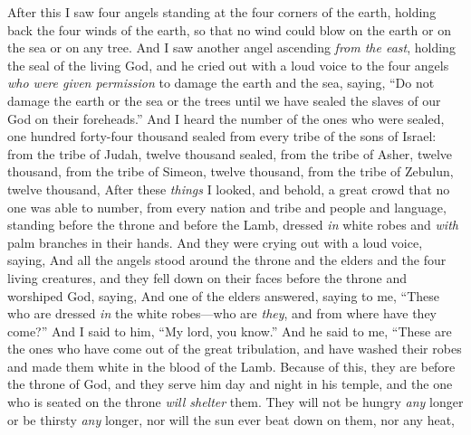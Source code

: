 \begin{biblechapter} %
 After this I saw four angels standing at the four corners of the earth, holding back the four winds of the earth, so that no wind could blow on the earth or on the sea or on any tree.
\verse And I saw another angel ascending \textit{from the east}, holding the seal of the living God, and he cried out with a loud voice to the four angels \textit{who were given permission} to damage the earth and the sea,
\verse saying, “Do not damage the earth or the sea or the trees until we have sealed the slaves of our God on their foreheads.”
\verse And I heard the number of the ones who were sealed, one hundred forty-four thousand sealed from every tribe of the sons of Israel:
\verse from the tribe of Judah, twelve thousand sealed,
\verse from the tribe of Asher, twelve thousand,
\verse from the tribe of Simeon, twelve thousand,
\verse from the tribe of Zebulun, twelve thousand,
 After these \textit{things} I looked, and behold, a great crowd that no one was able to number, from every nation and tribe and people and language, standing before the throne and before the Lamb, dressed \textit{in} white robes and \textit{with} palm branches in their hands.
\verse And they were crying out with a loud voice, saying,
\verse And all the angels stood around the throne and the elders and the four living creatures, and they fell down on their faces before the throne and worshiped God,
\verse saying,
\verse And one of the elders answered, saying to me, “These who are dressed \textit{in} the white robes—who are \textit{they}, and from where have they come?”
\verse And I said to him, “My lord, you know.” And he said to me,
\verse “These are the ones who have come out of the great tribulation, 
and have washed their robes 
and made them white in the blood of the Lamb.
\verse Because of this, they are before the throne of God, 
and they serve him day and night in his temple, 
and the one who is seated on the throne \textit{will shelter} them.
\verse They will not be hungry \textit{any} longer or be thirsty \textit{any} longer, 
nor will the sun ever beat down on them, nor any heat,
\end{biblechapter}

